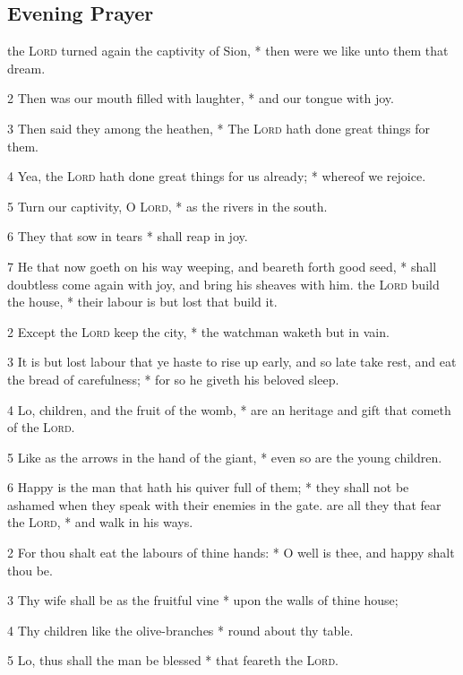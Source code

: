 \subsection{Evening Prayer}
 the {\textsc{Lord}} turned again the captivity of Sion, * then were we like unto them that dream.\par
2 Then was our mouth filled with laughter, * and our tongue with joy.\par
3 Then said they among the heathen, * The {\textsc{Lord}} hath done great things for them.\par
4 Yea, the {\textsc{Lord}} hath done great things for us already; * whereof we rejoice.\par
5 Turn our captivity, O {\textsc{Lord}}, * as the rivers in the south.\par
6 They that sow in tears * shall reap in joy.\par
7 He that now goeth on his way weeping, and beareth forth good seed, * shall doubtless come again with joy, and bring his sheaves with him.
 the {\textsc{Lord}} build the house, * their labour is but lost that build it.\par
2 Except the {\textsc{Lord}} keep the city, * the watchman waketh but in vain.\par
3 It is but lost labour that ye haste to rise up early, and so late take rest, and eat the bread of carefulness; * for so he giveth his beloved sleep.\par
4 Lo, children, and the fruit of the womb, * are an heritage and gift that cometh of the {\textsc{Lord}}.\par
5 Like as the arrows in the hand of the giant, * even so are the young children.\par
6 Happy is the man that hath his quiver full of them; * they shall not be ashamed when they speak with their enemies in the gate.
 are all they that fear the {\textsc{Lord}}, * and walk in his ways.\par
2 For thou shalt eat the labours of thine hands: * O well is thee, and happy shalt thou be.\par
3 Thy wife shall be as the fruitful vine * upon the walls of thine house;\par
4 Thy children like the olive-branches * round about thy table.\par
5 Lo, thus shall the man be blessed * that feareth the {\textsc{Lord}}.\par
